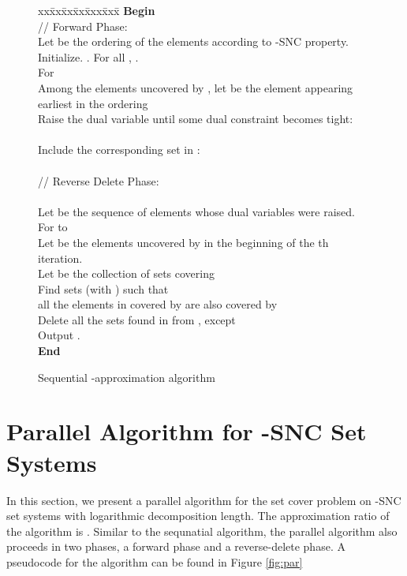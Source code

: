 \documentclass[11pt]{article}
\begin{document}
\begin{figure}[t]
\begin{center}
\begin{boxedminipage}{\hsize}
\begin{small}
\begin{tabbing}
xx\=xx\=xx\=xx\=xxx\=xxx\=\kill
\textbf{Begin}  \\
\> // Forward Phase:\\
\> Let  be the ordering of the elements according to -SNC property.\\
\> Initialize. . For all , .\\
\> For \\
\> \> Among the elements uncovered by , let  be the element appearing earliest in the ordering \\
\> \> Raise the dual variable  until some dual constraint becomes tight:\\
\> \> \> \\
\> \> \> Include the corresponding set  in :\\
\> \> \\
\> // Reverse Delete Phase:\\
\> \\
\> Let  be the sequence of elements whose dual variables were raised.\\
\> For  to \\
\> \> Let  be the elements uncovered by  in the beginning of the th iteration.\\
\> \> Let  be the collection of sets covering \\
\> \> Find sets  (with ) such that\\
\> \> \> all the elements in  covered by  are also covered by \\
\> \> Delete all the sets found in  from , except \\
\> \> Output .\\
\textbf{End}
\end{tabbing}
\end{small}
\end{boxedminipage}
\end{center}
\caption{Sequential -approximation algorithm}
\label{fig:seq-pseudo}
\end{figure}

\section{Parallel Algorithm for -SNC Set Systems}
\label{sec:main}
In this section, we present a parallel algorithm for the set cover problem on -SNC set systems with logarithmic decomposition length.
The approximation ratio of the algorithm is .
Similar to the sequnatial algorithm, the parallel algorithm also proceeds in two phases, a forward phase and a reverse-delete phase.
A pseudocode for the algorithm can be found in Figure \ref{fig:par}
\end{document}
